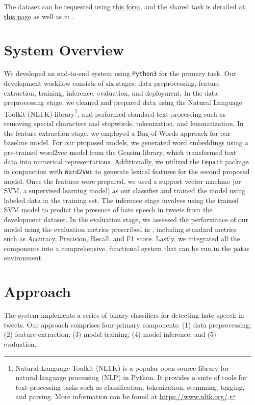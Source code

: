 \documentclass[11pt,a4paper]{article}
\begin{document}
   The dataset can be requested using \href{http://hatespeech.di.unito.it/hateval.html}{this form}, and the shared task is detailed at \href{https://competitions.codalab.org/competitions/19935#learn_the_details-overview}{this page} as well as in \citet{basile-etal-2019-semeval}.


\section{System Overview}
 We developed an end-to-end system using \verb|Python3| for the primary task. Our development workflow consists of six stages: data preprocessing, feature extraction, training, inference, evaluation, and deployment. In the data preprocessing stage, we cleaned and prepared data using the Natural Language Toolkit (NLTK) library\footnote{Natural Language Toolkit (NLTK) is a popular open-source library for natural language processing (NLP) in Python. It provides a suite of tools for text-processing tasks such as classification, tokenization, stemming, tagging, and parsing. More information can be found at \url{https://www.nltk.org/}.}, and performed standard text processing such as removing special characters and stopwords, tokenization, and lemmatization. In the feature extraction stage, we employed a Bag-of-Words approach for our baseline model. For our proposed models, we generated word embeddings using a pre-trained word2vec model from the Gensim library, which transformed text data into numerical representations. Additionally, we utilized the \verb|Empath| package in conjunction with \verb|Word2Vec| to generate lexical features for the second proposed model. Once the features were prepared, we used a support vector machine (or SVM, a supervised learning model) as our classifier and trained the model using labeled data in the training set. The inference stage involves using the trained SVM model to predict the presence of hate speech in tweets from the development dataset. In the evaluation stage, we assessed the performance of our model using the evaluation metrics prescribed in \citet{basile-etal-2019-semeval}, including standard metrics such as Accuracy, Precision, Recall, and F1 score. Lastly, we integrated all the components into a comprehensive, functional system that can be run in the patas environment.


\section{Approach}
The system implements a series of binary classifiers for detecting hate speech in tweets. Our approach comprises four primary components: (1) data preprocessing; (2) feature extraction; (3) model training; (4) model inference; and (5) evaluation. 
\end{document}
